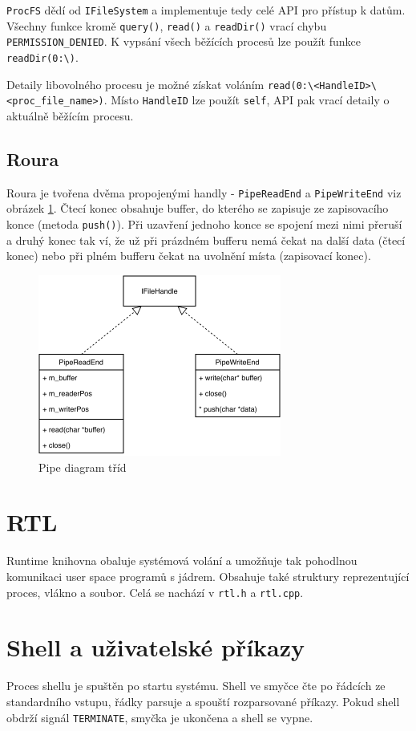 \documentclass[11pt,a4paper]{scrartcl}
\begin{document}
	\verb|ProcFS| dědí od \verb|IFileSystem| a implementuje tedy celé API pro přístup k datům. Všechny funkce kromě \verb|query()|, \verb|read()| a \verb|readDir()| vrací chybu \verb|PERMISSION_DENIED|. K vypsání všech běžících procesů lze použít funkce \verb|readDir(0:\)|.
	
	Detaily libovolného procesu je možné získat voláním \verb|read(0:\<HandleID>\<proc_file_name>)|. Místo \verb|HandleID| lze použít \verb|self|, API pak vrací detaily o aktuálně běžícím procesu.

	
	\subsection{Roura}
	
	Roura je tvořena dvěma propojenými handly - \verb|PipeReadEnd| a \verb|PipeWriteEnd| viz obrázek \ref{fig:pipe-c}. Čtecí konec obsahuje buffer, do kterého se zapisuje ze zapisovacího konce (metoda \verb|push()|). Při uzavření jednoho konce se spojení mezi nimi přeruší a druhý konec tak ví, že už při prázdném bufferu nemá čekat na další data (čtecí konec) nebo při plném bufferu čekat na uvolnění místa (zapisovací konec).
	
	\begin{figure}[H]
		\centering
		\includegraphics[width=8cm]{pipe-c.pdf}
		\caption{Pipe diagram tříd}
		\label{fig:pipe-c}
	\end{figure}
	
	\section{RTL}
	Runtime knihovna obaluje systémová volání a umožňuje tak pohodlnou komunikaci user space programů s jádrem. Obsahuje také struktury reprezentující proces, vlákno a soubor. Celá se nachází v \verb|rtl.h| a \verb|rtl.cpp|.
	
	\section{Shell a uživatelské příkazy}
	Proces shellu je spuštěn po startu systému. Shell ve smyčce čte po řádcích ze standardního vstupu, řádky parsuje a spouští rozparsované příkazy. Pokud shell obdrží signál \verb|TERMINATE|, smyčka je ukončena a shell se vypne.
	
\end{document}
